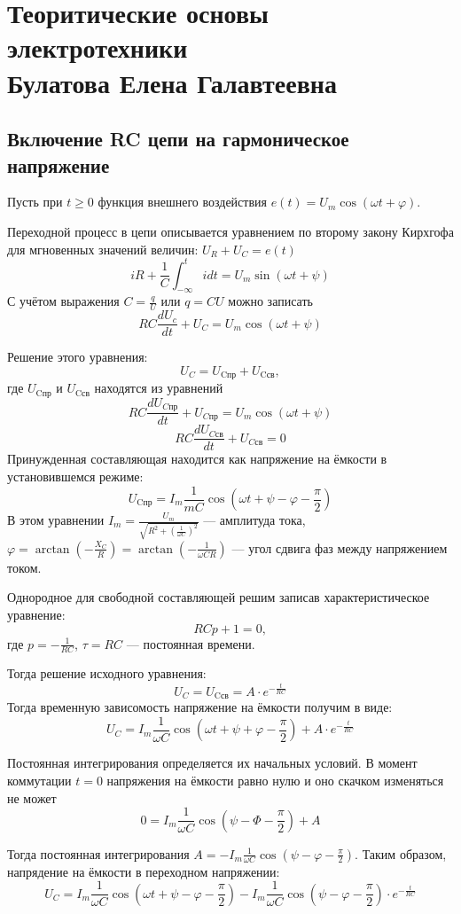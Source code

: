 \part[Теоритические основы электротехники]{
Теоритические основы электротехники \\
{\Large Булатова Елена Галавтеевна}
}

\chapter{Включение RC цепи на гармоническое напряжение}

Пусть при $t \geq 0$ функция внешнего воздействия $e(t) = U_m
	\cos(\omega t + \varphi)$.

Переходной процесс в цепи описывается уравнением по второму закону
Кирхгофа для мгновенных значений величин: $U_R + U_C = e(t)$
$$iR + \frac{1}{C} \int_{-\infty}^t i dt = U_m \sin(\omega t + \psi)$$
С учётом выражения $C = \frac{q}{U}$ или $q = CU$ можно записать
$$RC \frac{dU_c}{dt} + U_C = U_m \cos(\omega t + \psi)$$

Решение этого уравнения:
\[ U_C = U_\text{Cпр} + U_\text{Cсв}, \]
где $U_\text{Cпр}$ и $U_\text{Cсв}$ находятся из уравнений
\[ RC \frac{dU_{Cпр}}{dt} + U_{Cпр} = U_m \cos(\omega t + \psi) \]
\[ RC \frac{d U_{Cсв}}{dt} + U_{Cсв} = 0 \]
Принужденная составляющая находится как напряжение на ёмкости в
установившемся режиме:
\[ U_\text{Cпр} = I_m \frac{1}{mC} \cos(\omega t + \psi - \varphi -
	\frac{\pi}{2}) \]
В этом уравнении $I_m = \frac{U_m}{\sqrt{R^2 + \left(\frac{1}{\omega
				C}\right)^2}}$ — амплитуда тока, $\varphi = \arctan \left(-\frac{X_C}{R}\right)
	= \arctan\left(-\frac{1}{\omega CR}\right)$ --- угол  сдвига фаз  между
напряжением током.

Однородное для свободной составляющей решим записав
характеристическое уравнение:
\[ R Cp + 1 = 0, \]
где $p = -\frac{1}{RC}$, $\tau = RC$ — постоянная времени.

Тогда решение исходного уравнения:
\[ U_C = U_\text{Cсв} = A \cdot e^{-\frac{t}{RC}} \]
Тогда временную зависомость напряжение на ёмкости получим в виде:
\[ U_C = I_m \frac{1}{\omega C} \cos(\omega t + \psi + \varphi -
	\frac{\pi}{2}) + A \cdot e^{-\frac{t}{RC}} \]

Постоянная интегрирования определяется их начальных  условий. В
момент коммутации $t = 0$ напряжения на ёмкости  равно нулю и оно
скачком изменяться не может
\[ 0 = I_m \frac{1}{\omega C} \cos(\psi - \varPhi - \frac{\pi}{2}) + A \]

Тогда постоянная интегрирования $A = -I_m \frac{1}{\omega C}
	\cos(\psi - \varphi - \frac{\pi}{2})$. Таким образом, напрядение на
ёмкости в переходном напряжении:
\[ U_C = I_m \frac{1}{\omega C} \cos(\omega t + \psi - \varphi -
	\frac{\pi}{2}) - I_m \frac{1}{\omega C} \cos(\psi - \varphi -
	\frac{\pi}{2}) \cdot e^{-\frac{t}{RC}} \]

